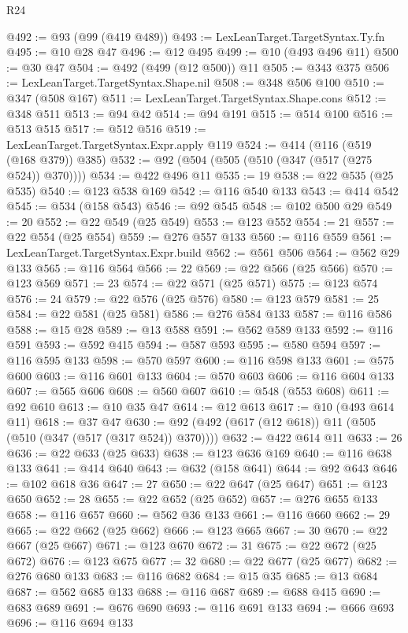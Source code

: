 \begin{lexlean}{R24}
\begin{coremodule}
@492 := @93 (@99 (@419 @489))
@493 := LexLeanTarget.TargetSyntax.Ty.fn
@495 := @10 @28 @47
@496 := @12 @495
@499 := @10 (@493 @496 @11)
@500 := @30 @47
@504 := @492 (@499 (@12 @500)) @11
@505 := @343 @375
@506 := LexLeanTarget.TargetSyntax.Shape.nil
@508 := @348 @506 @100
@510 := @347 (@508 @167)
@511 := LexLeanTarget.TargetSyntax.Shape.cons
@512 := @348 @511
@513 := @94 @42
@514 := @94 @191
@515 := @514 @100
@516 := @513 @515
@517 := @512 @516
@519 := LexLeanTarget.TargetSyntax.Expr.apply @119
@524 := @414 (@116 (@519 (@168 @379)) @385)
@532 := @92 (@504 (@505 (@510 (@347 (@517 (@275 @524)) @370))))
@534 := @422 @496 @11
@535 := 19
@538 := @22 @535 (@25 @535)
@540 := @123 @538 @169
@542 := @116 @540 @133
@543 := @414 @542
@545 := @534 (@158 @543)
@546 := @92 @545
@548 := @102 @500 @29
@549 := 20
@552 := @22 @549 (@25 @549)
@553 := @123 @552
@554 := 21
@557 := @22 @554 (@25 @554)
@559 := @276 @557 @133
@560 := @116 @559
@561 := LexLeanTarget.TargetSyntax.Expr.build
@562 := @561 @506
@564 := @562 @29 @133
@565 := @116 @564
@566 := 22
@569 := @22 @566 (@25 @566)
@570 := @123 @569
@571 := 23
@574 := @22 @571 (@25 @571)
@575 := @123 @574
@576 := 24
@579 := @22 @576 (@25 @576)
@580 := @123 @579
@581 := 25
@584 := @22 @581 (@25 @581)
@586 := @276 @584 @133
@587 := @116 @586
@588 := @15 @28
@589 := @13 @588
@591 := @562 @589 @133
@592 := @116 @591
@593 := @592 @415
@594 := @587 @593
@595 := @580 @594
@597 := @116 @595 @133
@598 := @570 @597
@600 := @116 @598 @133
@601 := @575 @600
@603 := @116 @601 @133
@604 := @570 @603
@606 := @116 @604 @133
@607 := @565 @606
@608 := @560 @607
@610 := @548 (@553 @608)
@611 := @92 @610
@613 := @10 @35 @47
@614 := @12 @613
@617 := @10 (@493 @614 @11)
@618 := @37 @47
@630 := @92 (@492 (@617 (@12 @618)) @11 (@505 (@510 (@347 (@517 (@317 @524)) @370))))
@632 := @422 @614 @11
@633 := 26
@636 := @22 @633 (@25 @633)
@638 := @123 @636 @169
@640 := @116 @638 @133
@641 := @414 @640
@643 := @632 (@158 @641)
@644 := @92 @643
@646 := @102 @618 @36
@647 := 27
@650 := @22 @647 (@25 @647)
@651 := @123 @650
@652 := 28
@655 := @22 @652 (@25 @652)
@657 := @276 @655 @133
@658 := @116 @657
@660 := @562 @36 @133
@661 := @116 @660
@662 := 29
@665 := @22 @662 (@25 @662)
@666 := @123 @665
@667 := 30
@670 := @22 @667 (@25 @667)
@671 := @123 @670
@672 := 31
@675 := @22 @672 (@25 @672)
@676 := @123 @675
@677 := 32
@680 := @22 @677 (@25 @677)
@682 := @276 @680 @133
@683 := @116 @682
@684 := @15 @35
@685 := @13 @684
@687 := @562 @685 @133
@688 := @116 @687
@689 := @688 @415
@690 := @683 @689
@691 := @676 @690
@693 := @116 @691 @133
@694 := @666 @693
@696 := @116 @694 @133

\end{coremodule}
\end{lexlean}
